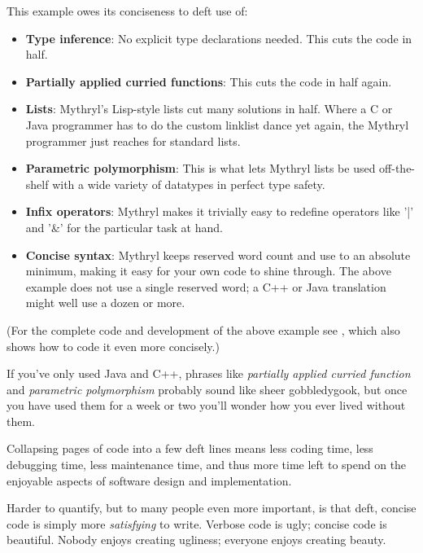 This example owes its conciseness to deft use of: 

\begin{itemize}
\item {\bf Type inference}:  No explicit type declarations needed. This cuts the code in half. 
\item {\bf Partially applied curried functions}:  This cuts the code in half again. 
\item {\bf Lists}:  Mythryl's Lisp-style lists cut many solutions in half.
                    Where a C or Java programmer has to do the custom linklist dance 
                    yet again, the Mythryl programmer just reaches for standard lists. 
\item {\bf Parametric polymorphism}:  This is what lets Mythryl lists be used off-the-shelf 
                    with a wide variety of datatypes in perfect type safety. 
\item {\bf Infix operators}:  Mythryl makes it trivially easy to redefine operators 
                    like '|' and '\&' for the particular task at hand.  
\item {\bf Concise syntax}:  Mythryl keeps reserved word count and use to an 
                    absolute minimum, making it easy for your own code to shine through. 
                    The above example does not use a single reserved word;  a C++ or Java translation 
                    might well use a dozen or more. 
\end{itemize}

(For the complete code and development of the above example 
see , which 
also shows how to code it even more concisely.)

If you've only used Java and C++, phrases like {\it partially applied curried function} 
and {\it parametric polymorphism} probably sound like sheer gobbledygook, but once you 
have used them for a week or two you'll wonder how you ever lived without them.

Collapsing pages of code into a few deft lines means less coding time, 
less debugging time, less maintenance time, and thus more time left to spend 
on the enjoyable aspects of software design and implementation.

Harder to quantify, but to many people even more important, is that 
deft, concise code is simply more {\it satisfying} to write.  Verbose 
code is ugly; concise code is beautiful.  Nobody enjoys creating 
ugliness; everyone enjoys creating beauty.

